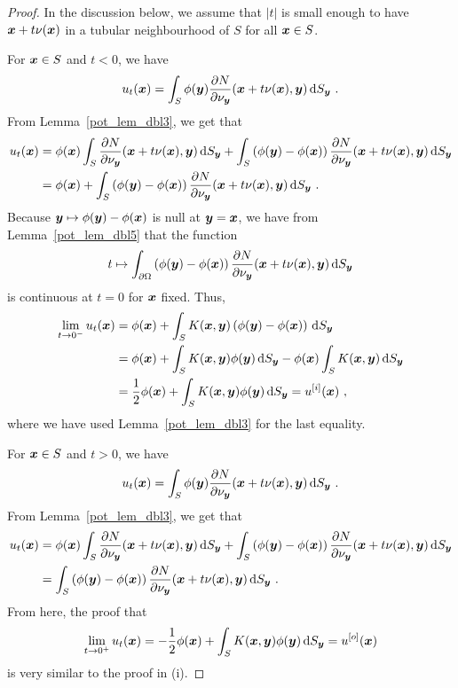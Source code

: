 \begin{proof}
In the discussion below, we assume that $|t|$ is small enough to have
${\bm{x}} + t \nu({\bm{x}})$ in a tubular neighbourhood of $S$ for
all ${\bm{x}} \in S$.  

For ${\bm{x}} \in S$ and $t<0$, we have
\[
u_t({\bm{x}}) = \int_S \phi({\bm{y}})
\frac{\partial{N}}{\partial \nu_{{\bm{y}}}}({\bm{x}} +t \nu({\bm{x}}),{\bm{y}})
\,\mathrm{d}{S}_{{\bm{y}}} \ .
\]
From Lemma~\ref{pot_lem_dbl3}, we get that
\begin{align*}
u_t({\bm{x}}) &= \phi({\bm{x}}) \int_S \frac{\partial{N}}{\partial \nu_{{\bm{y}}}}
({\bm{x}} +t \nu({\bm{x}}),{\bm{y}}) \,\mathrm{d}{S}_{{\bm{y}}}
+ \int_S \left( \phi({\bm{y}}) - \phi({\bm{x}}) \right)
\frac{\partial{N}}{\partial \nu_{{\bm{y}}}}({\bm{x}} +t \nu({\bm{x}}),{\bm{y}})
\,\mathrm{d}{S}_{{\bm{y}}} \\
&= \phi({\bm{x}}) + \int_S \left( \phi({\bm{y}}) - \phi({\bm{x}}) \right) 
\frac{\partial{N}}{\partial \nu_{{\bm{y}}}}({\bm{x}} +t \nu({\bm{x}}),{\bm{y}})
\,\mathrm{d}{S}_{{\bm{y}}} \ .
\end{align*}
Because ${\bm{y}} \mapsto \phi({\bm{y}})-\phi({\bm{x}})$ is null at
${\bm{y}}={\bm{x}}$, we have from Lemma~\ref{pot_lem_dbl5} that the function
\[
t \mapsto \int_{\partial \Omega}
\left( \phi({\bm{y}}) - \phi({\bm{x}}) \right)
\frac{\partial{N}}{\partial \nu_{{\bm{y}}}}({\bm{x}} +t \nu({\bm{x}}),{\bm{y}})
\,\mathrm{d}{S}_{{\bm{y}}}
\]
is continuous at $t=0$ for ${\bm{x}}$ fixed.  Thus,
\begin{align*}
\lim_{t\rightarrow 0^-} u_t({\bm{x}})
&= \phi({\bm{x}}) + \int_S K({\bm{x}},{\bm{y}}) \left( \phi({\bm{y}})
- \phi({\bm{x}}) \right) \,\mathrm{d}{S}_{{\bm{y}}} \\
&= \phi({\bm{x}}) +
\int_S K({\bm{x}},{\bm{y}}) \phi({\bm{y}}) \,\mathrm{d}{S}_{{\bm{y}}}
- \phi({\bm{x}}) \int_S K({\bm{x}},{\bm{y}}) \,\mathrm{d}{S}_{{\bm{y}}} \\
&= \frac{1}{2} \phi({\bm{x}})
+ \int_S K({\bm{x}},{\bm{y}}) \phi({\bm{y}}) \,\mathrm{d}{S}_{{\bm{y}}}
= u^{[i]}({\bm{x}}) \ ,
\end{align*}
where we have used Lemma~\ref{pot_lem_dbl3} for the last
equality.

For ${\bm{x}} \in S$ and $t>0$, we have
\[
u_t({\bm{x}}) = \int_S \phi({\bm{y}})
\frac{\partial{N}}{\partial \nu_{{\bm{y}}}}({\bm{x}} +t \nu({\bm{x}}),{\bm{y}})
\,\mathrm{d}{S}_{{\bm{y}}} \ .
\]
From Lemma~\ref{pot_lem_dbl3}, we get that
\begin{align*}
u_t({\bm{x}}) &= \phi({\bm{x}}) \int_S \frac{\partial{N}}{\partial \nu_{{\bm{y}}}}
({\bm{x}} +t \nu({\bm{x}}),{\bm{y}}) \,\mathrm{d}{S}_{{\bm{y}}}
+ \int_S \left( \phi({\bm{y}}) - \phi({\bm{x}}) \right)
\frac{\partial{N}}{\partial \nu_{{\bm{y}}}}({\bm{x}} +t \nu({\bm{x}}),{\bm{y}})
\,\mathrm{d}{S}_{{\bm{y}}} \\
&= \int_S \left( \phi({\bm{y}}) - \phi({\bm{x}}) \right) 
\frac{\partial{N}}{\partial \nu_{{\bm{y}}}}({\bm{x}} +t \nu({\bm{x}}),{\bm{y}})
\,\mathrm{d}{S}_{{\bm{y}}} \ .
\end{align*}
From here, the proof that
\[
\lim_{t\rightarrow 0^+} u_t({\bm{x}}) = -\frac{1}{2} \phi({\bm{x}}) +
\int_S K({\bm{x}},{\bm{y}}) \phi({\bm{y}}) \,\mathrm{d}{S}_{{\bm{y}}} = u^{[o]}({\bm{x}})
\]
is very similar to the proof in (i).


\end{proof}
